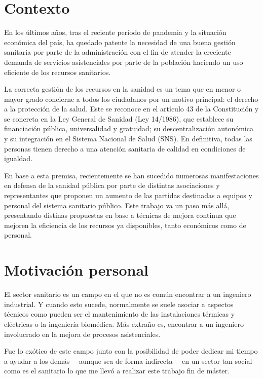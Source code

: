 \section{Contexto}

En los últimos años, tras el reciente periodo de pandemia y la situación económica del país, ha quedado patente la necesidad de una buena gestión sanitaria por parte de la administración con el fin de atender la creciente demanda de servicios asistenciales por parte de la población haciendo un uso eficiente de los recursos sanitarios.

La correcta gestión de los recursos en la sanidad es un tema que en menor o mayor grado concierne a todos los ciudadanos por un motivo principal: el derecho a la protección de la salud.
Este se reconoce en el artículo 43 de la Constitución y se concreta en la Ley General de Sanidad (Ley 14/1986), que establece su financiación pública, universalidad y gratuidad; su descentralización autonómica y su integración en el Sistema Nacional de Salud (SNS).
En definitiva, todas las personas tienen derecho a una atención sanitaria de calidad en condiciones de igualdad.

En base a esta premisa, recientemente se han sucedido numerosas manifestaciones en defensa de la sanidad pública por parte de distintas asociaciones y representantes que proponen un aumento de las partidas destinadas a equipos y personal del sistema sanitario público.
Este trabajo va un paso más allá, presentando distinas propuestas en base a técnicas de mejora continua que mejoren la eficiencia de los recursos ya disponibles, tanto económicos como de personal.

\section{Motivación personal}

El sector sanitario es un campo en el que no es común encontrar a un ingeniero industrial.
Y cuando esto sucede, normalmente se suele asociar a aspectos técnicos como pueden ser el mantenimiento de las instalaciones térmicas y eléctricas o la ingeniería biomédica. Más extraño es, encontrar a un ingeniero involucrado en la mejora de procesos asistenciales.

Fue lo exótico de este campo junto con la posibilidad de poder dedicar mi tiempo a ayudar a los demás —aunque sea de forma indirecta— en un sector tan social como es el sanitario lo que me llevó a realizar este trabajo fin de máster.


